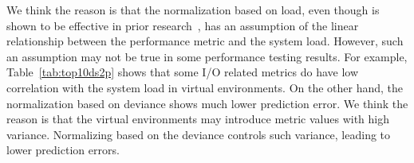We think the reason is that the normalization based on load, even though is shown to be effective in prior research~\cite{Nguyen:2012:ADP:2188286.2188344}, has an assumption of the linear relationship between the performance metric and the system load. However, such an assumption may not be true in some performance testing results. For example, Table~\ref{tab:top10ds2p} shows that some I/O related metrics do have low correlation with the system load in virtual environments. On the other hand, the normalization based on deviance shows much lower prediction error. We think the reason is that the virtual environments may introduce metric values with high variance. Normalizing based on the deviance controls such variance, leading to lower prediction errors.








